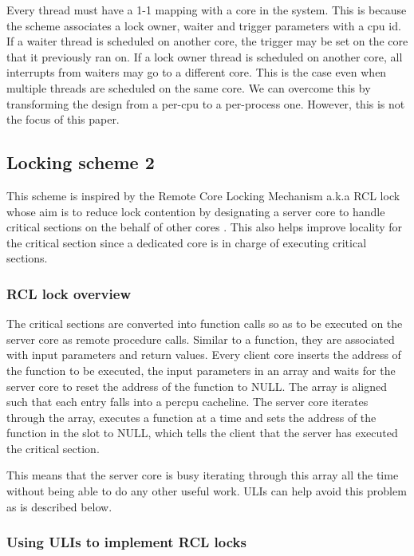 Every thread must have a 1-1 mapping with a core in the system. This is because
the scheme associates a lock owner, waiter and trigger parameters with a cpu id.
If a waiter thread is scheduled on another core, the trigger may be set on the
core that it previously ran on. If a lock owner thread is scheduled on another
core, all interrupts from waiters may go to a different core. This is the case
even when multiple threads are scheduled on the same core. We can overcome this
by transforming the design from a per-cpu to a per-process one. However, this is
not the focus of this paper.

\subsection{Locking scheme 2}

This scheme is inspired by the Remote Core Locking Mechanism a.k.a RCL lock
whose aim is to reduce lock contention by designating a server core to handle
critical sections on the behalf of other cores \cite{lozi}. This also helps improve locality
for the critical section since a dedicated core is in charge of executing
critical sections. 

\subsubsection{RCL lock overview}

The critical sections are converted into function calls so as to be executed on
the server core as remote procedure calls. Similar to a function, they are
associated with input parameters and return values. Every client core inserts
the address of the function to be executed, the input parameters in an array and
waits for the server core to reset the address of the function to NULL. The
array is aligned such that each entry falls into a percpu cacheline. The server
core iterates through the array, executes a function at a time and sets the
address of the function in the slot to NULL, which tells the client that the
server has executed the critical section.

This means that the server core is busy iterating through this array all the
time without being able to do any other useful work. ULIs can help avoid this
problem as is described below.

\subsubsection{Using ULIs to implement RCL locks}


